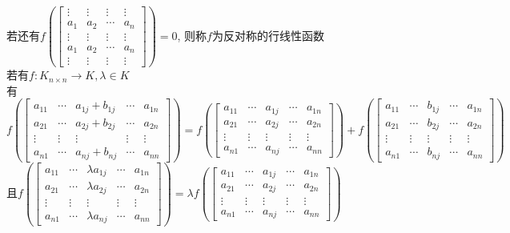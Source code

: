 \begin{dingyi}
若还有$f(\begin{bmatrix}\vdots & \vdots & \vdots & \vdots \\ a_{1} & a_{2} & \cdots & a_{n}  \\ \vdots & \vdots & \vdots & \vdots \\ a_{1} & a_{2} & \cdots & a_{n}  \\ \vdots & \vdots & \vdots & \vdots \end{bmatrix})=0$,
则称$f$为反对称的行线性函数\\
若有$f:K_{n\times n}\to K, \lambda\in K$\\
有$f(\begin{bmatrix}a_{11} & \cdots & a_{1j}+b_{1j} & \cdots & a_{1n} \\ a_{21} & \cdots & a_{2j}+b_{2j} & \cdots & a_{2n} \\ \vdots & \vdots & \vdots & \vdots & \vdots \\ a_{n1} & \cdots & a_{nj}+b_{nj} & \cdots & a_{nn} \end{bmatrix})=f(\begin{bmatrix}a_{11} & \cdots & a_{1j} & \cdots & a_{1n} \\ a_{21} & \cdots & a_{2j} & \cdots & a_{2n} \\ \vdots & \vdots & \vdots & \vdots & \vdots \\ a_{n1} & \cdots & a_{nj} & \cdots & a_{nn} \end{bmatrix})+f(\begin{bmatrix}a_{11} & \cdots & b_{1j} & \cdots & a_{1n} \\ a_{21} & \cdots & b_{2j} & \cdots & a_{2n} \\ \vdots & \vdots & \vdots & \vdots & \vdots \\ a_{n1} & \cdots & b_{nj} & \cdots & a_{nn} \end{bmatrix})$\\
且$f(\begin{bmatrix}a_{11} & \cdots & \lambda a_{1j} & \cdots & a_{1n} \\ a_{21} & \cdots & \lambda a_{2j} & \cdots & a_{2n} \\ \vdots & \vdots & \vdots & \vdots & \vdots \\ a_{n1} & \cdots & \lambda a_{nj} & \cdots & a_{nn} \end{bmatrix})=\lambda f(\begin{bmatrix}a_{11} & \cdots & a_{1j} & \cdots & a_{1n} \\ a_{21} & \cdots & a_{2j} & \cdots & a_{2n} \\ \vdots & \vdots & \vdots & \vdots & \vdots \\ a_{n1} & \cdots & a_{nj} & \cdots & a_{nn} \end{bmatrix})$

\end{dingyi}

